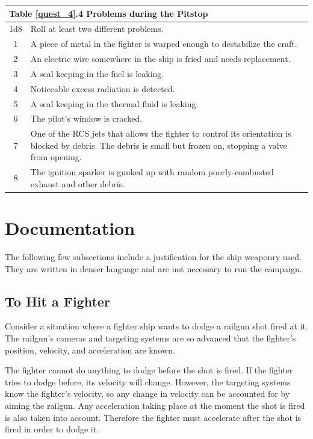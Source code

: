 \documentclass[a4paper]{article}
\begin{document}
\vspace{0.2cm}
\begin{tabular}[t]{| c | p{12.5cm} |}
\toprule
\multicolumn{2}{|l|}{Table \ref{quest_4}.4 Problems during the Pitstop} \\
\midrule
1d8 & Roll at least two different problems. \\
\midrule
1 & A piece of metal in the fighter is warped enough to destabilize the craft. \\
2 & An electric wire somewhere in the ship is fried and needs replacement. \\ 
3 & A seal keeping in the fuel is leaking. \\ 
4 & Noticeable excess radiation is detected. \\
5 & A seal keeping in the thermal fluid is leaking. \\ 
6 & The pilot's window is cracked. \\
7 & One of the RCS jets that allows the fighter to control its orientation is blocked by debris. The debris is small but frozen on, stopping a valve from opening. \\
8 & The ignition sparker is gunked up with random poorly-combusted exhaust and other debris. \\
\bottomrule
\end{tabular}


\section{Documentation}

The following few subsections include a justification for the ship weaponry used. They are written in denser language and are not necessary to run the campaign.

\subsection{To Hit a Fighter}

Consider a situation where a fighter ship wants to dodge a railgun shot fired at it. The railgun's cameras and targeting systems are so advanced that the fighter's position, velocity, and acceleration are known. 

The fighter cannot do anything to dodge before the shot is fired. If the fighter tries to dodge before, its velocity will change. However, the targeting systems know the fighter's velocity, so any change in velocity can be accounted for by aiming the railgun. Any acceleration taking place at the moment the shot is fired is also taken into account. Therefore the fighter must accelerate after the shot is fired in order to dodge it.
\end{document}
